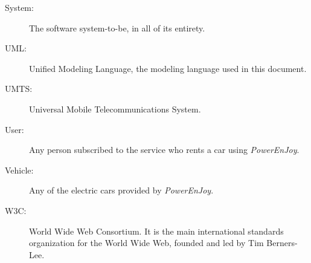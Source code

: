 \begin{description}
\item[System:] The software system-to-be, in all of its entirety.
\item[UML:] Unified Modeling Language, the modeling language used in this document.
\item[UMTS:] Universal Mobile Telecommunications System.
\item[User:] Any person subscribed to the service who rents a car using \hbox{\emph{PowerEnJoy}}.
\item[Vehicle:] Any of the electric cars provided by \emph{PowerEnJoy}.
\item[W3C:] World Wide Web Consortium. It is the main international standards organization for the World Wide Web, founded and led by Tim Berners-Lee.
\end{description}

